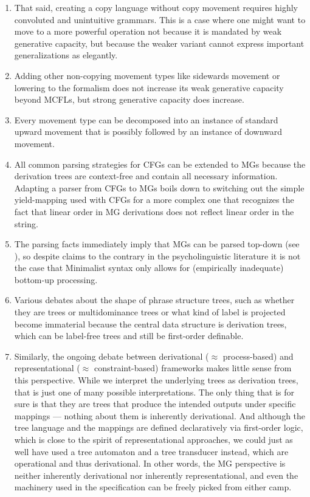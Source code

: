 \begin{enumerate}
    \item That said, creating a copy language without copy movement requires highly convoluted and unintuitive grammars.
        This is a case where one might want to move to a more powerful operation not because it is mandated by weak generative capacity, but because the weaker variant cannot express important generalizations as elegantly. 
    \item Adding other non-copying movement types like sidewards movement or lowering to the formalism does not increase its weak generative capacity beyond MCFLs, but strong generative capacity does increase.
    \item Every movement type can be decomposed into an instance of standard upward movement that is possibly followed by an instance of downward movement.
    \item All common parsing strategies for CFGs can be extended to MGs because the derivation trees are context-free and contain all necessary information.
        Adapting a parser from CFGs to MGs boils down to switching out the simple yield-mapping used with CFGs for a more complex one that recognizes the fact that linear order in MG derivations does not reflect linear order in the string.
    \item The parsing facts immediately imply that MGs can be parsed top-down (see \citealt{Stabler12}), so despite claims to the contrary in the psycholinguistic literature it is not the case that Minimalist syntax only allows for (empirically inadequate) bottom-up processing.
    \item Various debates about the shape of phrase structure trees, such as whether they are trees or multidominance trees or what kind of label is projected become immaterial because the central data structure is derivation trees, which can be label-free trees and still be first-order definable.
    \item Similarly, the ongoing debate between derivational ($\approx$ process-based) and representational ($\approx$ constraint-based) frameworks makes little sense from this perspective.
        While we interpret the underlying trees as derivation trees, that is just one of many possible interpretations.
        The only thing that is for sure is that they are trees that produce the intended outputs under specific mappings --- nothing about them is inherently derivational.
        And although the tree language and the mappings are defined declaratively via first-order logic, which is close to the spirit of representational approaches, we could just as well have used a tree automaton and a tree transducer instead, which are operational and thus derivational.
        In other words, the MG perspective is neither inherently derivational nor inherently representational, and even the machinery used in the specification can be freely picked from either camp.
\end{enumerate}

